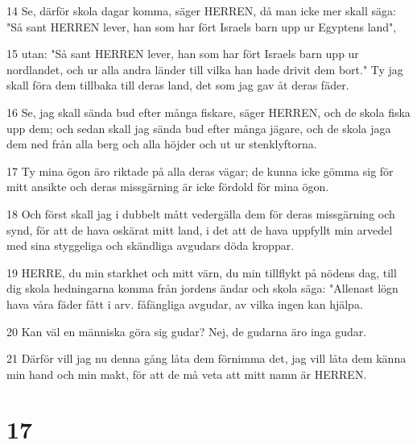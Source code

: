 \par 14 Se, därför skola dagar komma, säger HERREN, då man icke mer skall säga: "Så sant HERREN lever, han som har fört Israels barn upp ur Egyptens land",
\par 15 utan: "Så sant HERREN lever, han som har fört Israels barn upp ur nordlandet, och ur alla andra länder till vilka han hade drivit dem bort." Ty jag skall föra dem tillbaka till deras land, det som jag gav åt deras fäder.
\par 16 Se, jag skall sända bud efter många fiskare, säger HERREN, och de skola fiska upp dem; och sedan skall jag sända bud efter många jägare, och de skola jaga dem ned från alla berg och alla höjder och ut ur stenklyftorna.
\par 17 Ty mina ögon äro riktade på alla deras vägar; de kunna icke gömma sig för mitt ansikte och deras missgärning är icke fördold för mina ögon.
\par 18 Och först skall jag i dubbelt mått vedergälla dem för deras missgärning och synd, för att de hava oskärat mitt land, i det att de hava uppfyllt min arvedel med sina styggeliga och skändliga avgudars döda kroppar.
\par 19 HERRE, du min starkhet och mitt värn, du min tillflykt på nödens dag, till dig skola hedningarna komma från jordens ändar och skola säga: "Allenast lögn hava våra fäder fått i arv. fåfängliga avgudar, av vilka ingen kan hjälpa.
\par 20 Kan väl en människa göra sig gudar? Nej, de gudarna äro inga gudar.
\par 21 Därför vill jag nu denna gång låta dem förnimma det, jag vill låta dem känna min hand och min makt, för att de må veta att mitt namn är HERREN.

\chapter{17}

